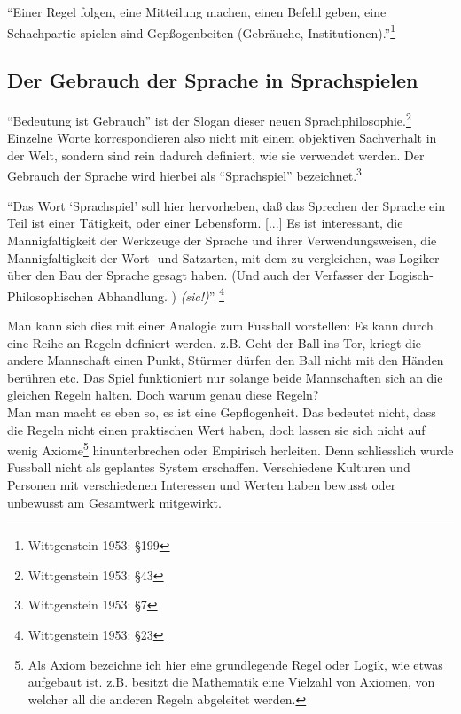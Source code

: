 \documentclass[a4paper,10pt]{article}
\begin{document}
\begin{displayquote}
\enquote{Einer Regel folgen, eine Mitteilung machen, einen Befehl geben, eine Schachpartie spielen sind Gepßogenbeiten (Gebräuche, Institutionen).}\footnote{Wittgenstein 1953: §199}
\end{displayquote}


\subsection{Der Gebrauch der Sprache in Sprachspielen}
\enquote{Bedeutung ist Gebrauch} ist der Slogan dieser neuen Sprachphilosophie.\footnote{Wittgenstein 1953: §43} Einzelne Worte korrespondieren also nicht mit einem objektiven Sachverhalt in der Welt, sondern sind rein dadurch definiert, wie sie verwendet werden. Der Gebrauch der Sprache wird hierbei als \enquote{Sprachspiel} bezeichnet.\footnote{Wittgenstein 1953: §7}

\begin{displayquote}
\enquote{Das Wort \enquote{Sprachspiel} soll hier hervorheben, daß das Sprechen
der Sprache ein Teil ist einer Tätigkeit, oder einer Lebensform. [...]
Es ist interessant, die Mannigfaltigkeit der Werkzeuge der Sprache
und ihrer Verwendungsweisen, die Mannigfaltigkeit der Wort- und
Satzarten, mit dem zu vergleichen, was Logiker über den Bau der
Sprache gesagt haben. (Und auch der Verfasser der Logisch-Philosophischen Abhandlung. ) \textit{(sic!)}} \footnote{Wittgenstein 1953: §23}
\end{displayquote}

Man kann sich dies mit einer Analogie zum Fussball vorstellen: Es kann durch eine Reihe an Regeln definiert werden. z.B. Geht der Ball ins Tor, kriegt die andere Mannschaft einen Punkt, Stürmer dürfen den Ball nicht mit den Händen berühren etc. Das Spiel funktioniert nur solange beide Mannschaften sich an die gleichen Regeln halten. Doch warum genau diese Regeln? \\ Man man macht es eben so, es ist eine Gepflogenheit. Das bedeutet nicht, dass die Regeln nicht einen praktischen Wert haben, doch lassen sie sich nicht auf wenig Axiome\footnote{Als Axiom bezeichne ich hier eine grundlegende Regel oder Logik, wie etwas aufgebaut ist. z.B. besitzt die Mathematik eine Vielzahl von Axiomen, von welcher all die anderen Regeln abgeleitet werden.} hinunterbrechen oder Empirisch herleiten. Denn schliesslich wurde Fussball nicht als geplantes System erschaffen. Verschiedene Kulturen und Personen mit verschiedenen Interessen und Werten haben bewusst oder unbewusst am Gesamtwerk mitgewirkt.
\end{document}
